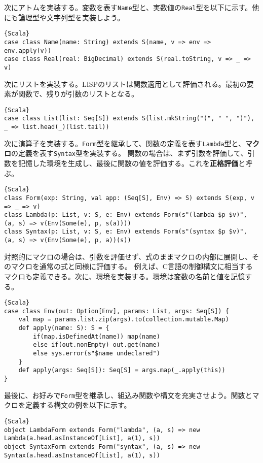 \documentclass[10pt,a4paper]{book}
\begin{document}
次にアトムを実装する。変数を表す\texttt{Name}型と、実数値の\texttt{Real}型を以下に示す。他にも論理型や文字列型を実装しよう。

\begin{Verbatim}{Scala}
case class Name(name: String) extends S(name, v => env => env.apply(v))
case class Real(real: BigDecimal) extends S(real.toString, v => _ => v)
\end{Verbatim}

次にリストを実装する。LISPのリストは関数適用として評価される。最初の要素が関数で、残りが引数のリストとなる。

\begin{Verbatim}{Scala}
case class List(list: Seq[S]) extends S(list.mkString("(", " ", ")"), _ => list.head(_)(list.tail))
\end{Verbatim}

次に演算子を実装する。\texttt{Form}型を継承して、関数の定義を表す\texttt{Lambda}型と、\textbf{マクロ}の定義を表す\texttt{Syntax}型を実装する。
関数の場合は、まず引数を評価して、引数を記憶した環境を生成し、最後に関数の値を評価する。これを\textbf{正格評価}と呼ぶ。

\begin{Verbatim}{Scala}
class Form(exp: String, val app: (Seq[S], Env) => S) extends S(exp, v => _ => v)
class Lambda(p: List, v: S, e: Env) extends Form(s"(lambda $p $v)", (a, s) => v(Env(Some(e), p, s(a))))
class Syntax(p: List, v: S, e: Env) extends Form(s"(syntax $p $v)", (a, s) => v(Env(Some(e), p, a))(s))
\end{Verbatim}

対照的にマクロの場合は、引数を評価せず、式のままマクロの内部に展開し、そのマクロを通常の式と同様に評価する。
例えば、C言語の制御構文に相当するマクロも定義できる。次に、環境を実装する。環境は変数の名前と値を記憶する。

\begin{Verbatim}{Scala}
case class Env(out: Option[Env], params: List, args: Seq[S]) {
	val map = params.list.zip(args).to(collection.mutable.Map)
	def apply(name: S): S = {
		if(map.isDefinedAt(name)) map(name)
		else if(out.nonEmpty) out.get(name)
		else sys.error(s"$name undeclared")
	}
	def apply(args: Seq[S]): Seq[S] = args.map(_.apply(this))
}
\end{Verbatim}

最後に、お好みで\texttt{Form}型を継承し、組込み関数や構文を充実させよう。関数とマクロを定義する構文の例を以下に示す。

\begin{Verbatim}{Scala}
object LambdaForm extends Form("lambda", (a, s) => new Lambda(a.head.asInstanceOf[List], a(1), s))
object SyntaxForm extends Form("syntax", (a, s) => new Syntax(a.head.asInstanceOf[List], a(1), s))
\end{Verbatim}
\end{document}
